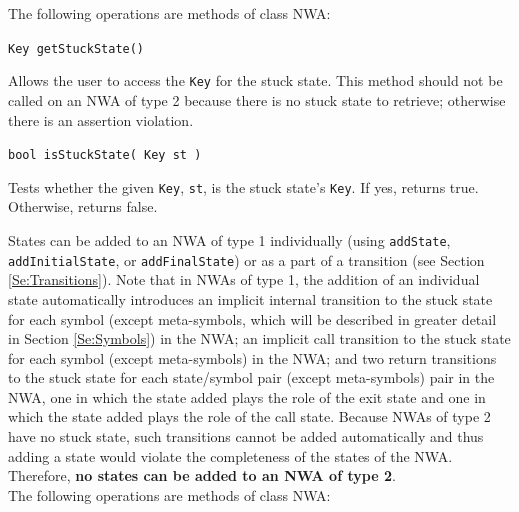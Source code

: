 \documentclass{llncs}
\begin{document}
\noindent The following operations are methods of class NWA:

\begin{description}

  \item\texttt{Key getStuckState()}

    Allows the user to access the \texttt{Key} for the stuck state.  This method should not be called on an NWA of type 2 because there is no stuck state to retrieve; otherwise there is an assertion violation. 

  \item\texttt{bool isStuckState( Key st )}

    Tests whether the given \texttt{Key}, \texttt{st}, is the stuck state's \texttt{Key}.  If yes, returns true.  Otherwise, returns false. \\

\end{description}

States can be added to an NWA of type 1 individually (using \texttt{addState}, \texttt{addInitialState}, or \texttt{addFinalState}) or as a part of a transition (see Section \ref{Se:Transitions}). Note that in NWAs of type 1, the addition of an individual state automatically introduces an implicit internal transition to the stuck state for each symbol (except meta-symbols, which will be described in greater detail in Section \ref{Se:Symbols}) in the NWA; an implicit call transition to the stuck state for each symbol (except meta-symbols) in the NWA; and two return transitions to the stuck state for each state/symbol pair (except meta-symbols) pair in the NWA, one in which the state added plays the role of the exit state and one in which the state added plays the role of the call state.  Because NWAs of type 2 have no stuck state, such transitions cannot be added automatically and thus adding a state would violate the completeness of the states of the NWA.  Therefore, \textbf{no states can be added to an NWA of type 2}. \\

\noindent The following operations are methods of class NWA:
\end{document}
